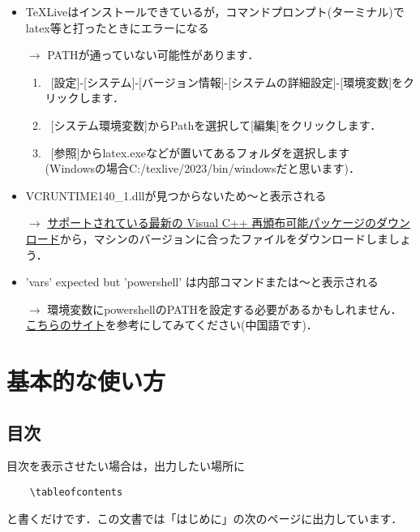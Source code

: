 \documentclass[a4paper, 11pt, uplatex]{jsreport}
\numberwithin{equation}{section}
\theoremstyle{definition}
\begin{document}
\begin{itemize}
    \item TeXLiveはインストールできているが，コマンドプロンプト(ターミナル)でlatex等と打ったときにエラーになる
    \item[$\rightarrow$] PATHが通っていない可能性があります．
        \begin{enumerate}
            \item\ [設定]-[システム]-[バージョン情報]-[システムの詳細設定]-[環境変数]をクリックします．
            \item\ [システム環境変数]からPathを選択して[編集]をクリックします．
            \item\ [参照]からlatex.exeなどが置いてあるフォルダを選択します \\
            (Windowsの場合C:/texlive/2023/bin/windowsだと思います)．
        \end{enumerate}
\end{itemize}

\begin{itemize}
    \item VCRUNTIME140\_1.dllが見つからないため〜と表示される
    \item[$\rightarrow$] \href{https://learn.microsoft.com/ja-JP/cpp/windows/latest-supported-vc-redist?view=msvc-170}{サポートされている最新の Visual C++ 再頒布可能パッケージのダウンロード}から，マシンのバージョンに合ったファイルをダウンロードしましょう．
\end{itemize}

\begin{itemize}
    \item 'vars' expected but 'powershell' は内部コマンドまたは〜と表示される
    \item[$\rightarrow$] 環境変数にpowershellのPATHを設定する必要があるかもしれません．
        \href{https://blog.csdn.net/weixin_45030118/article/details/130040386}{こちらのサイト}を参考にしてみてください(中国語です)．
\end{itemize}



\chapter{基本的な使い方}


\section{目次}

目次を表示させたい場合は，出力したい場所に
\begin{verbatim}
    \tableofcontents
\end{verbatim}
と書くだけです．この文書では「はじめに」の次のページに出力しています．
\end{document}
